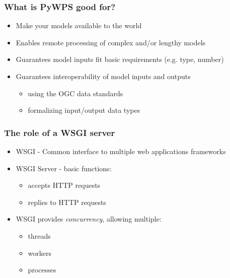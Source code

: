 \documentclass{beamer}
\begin{document}
\begin{frame}
\frametitle{What is PyWPS good for?}

\begin{itemize}
  \item Make your models available to the world
  \item Enables remote processing of complex and/or lengthy models
  \item Guarantees model inputs fit basic requirements
        (e.g. type, number)
  \item Guarantees interoperability of model inputs and outputs
  \begin{itemize}
    \item using the OGC data standards
	\item formalizing input/output data types
  \end{itemize}
\end{itemize}
\end{frame}

\begin{frame}
\frametitle<presentation>{The role of a WSGI server}

\begin{itemize}
  \item WSGI - Common interface to multiple web applications frameworks
  \item WSGI Server - basic functions:
  \begin{itemize}
    \item accepts HTTP requests
    \item replies to HTTP requests
  \end{itemize}
  \item WSGI provides \textit{concurrency}, allowing multiple:
  \begin{itemize}
    \item threads
    \item workers
    \item processes
  \end{itemize}
\end{itemize}
\end{frame}
\end{document}

